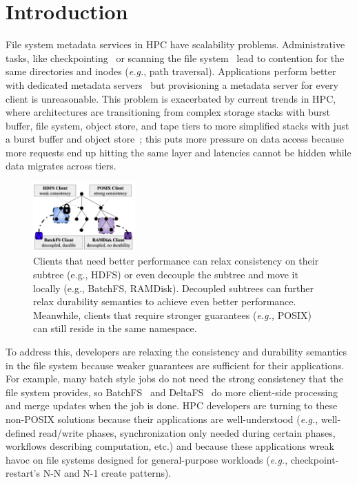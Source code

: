 \section{Introduction}

File system metadata services in HPC have scalability problems. Administrative
tasks, like checkpointing~\cite{bent_plfs_2009} or scanning the file
system~\cite{zheng:pdsw2014-batchfs} lead to contention for the same
directories and inodes ({\it e.g.}, path traversal). Applications perform
better with dedicated metadata servers~\cite{sevilla:sc15-mantle,
ren:sc2014-indexfs} but provisioning a metadata server for every client is
unreasonable. This problem is exacerbated by current trends in HPC, where
architectures are transitioning from complex storage stacks with burst buffer,
file system, object store, and tape tiers to more simplified stacks with just a
burst buffer and object store~\cite{bent:login16-hpc-trends}; this puts more
pressure on data access because more requests end up hitting the same layer and
latencies cannot be hidden while data migrates across tiers.

\begin{figure}[tb]
\centering
\includegraphics[width=0.35\textwidth]{figures/subtree-policies1.png}
\caption{ Clients that need better performance can relax consistency on their
subtree ({e.g.}, HDFS) or even decouple the subtree and move it locally
({e.g.}, BatchFS, RAMDisk). Decoupled subtrees can further relax durability
semantics to achieve even better performance. Meanwhile, clients that require
stronger guarantees ({\it e.g.,} POSIX) can still reside in the same namespace.
}\label{fig:subtree-policies}
\end{figure}

To address this, developers are relaxing the consistency and durability
semantics in the file system because weaker guarantees are sufficient for their
applications. For example, many batch style jobs do not need the strong
consistency that the file system provides, so
BatchFS~\cite{zheng:pdsw2014-batchfs} and DeltaFS~\cite{zheng:pdsw2015-deltafs}
do more client-side processing and merge updates when the job is done. HPC
developers are turning to these non-POSIX solutions because their applications
are well-understood ({\it e.g.}, well-defined read/write phases,
synchronization only needed during certain phases, workflows describing
computation, etc.) and because these applications wreak havoc on file systems designed for
general-purpose workloads ({\it e.g.}, checkpoint-restart's N-N and N-1 create
patterns).

